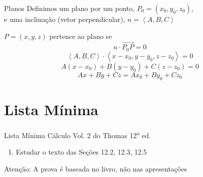 \documentclass[fleqn,utf8,aspectratio=169,12pt,ignorenonframetext]{beamer}
\begin{document}
\begin{frame}{Planos}
  Definimos um plano por um ponto, $P_0=(x_0, y_0, z_0)$, \\
  \pause
  e uma inclinação (vetor perpendicular), $n=\left<A, B, C\right>$

  \pause
  \vspace{\baselineskip}
  $P=(x, y, z)$ pertence ao plano se
  \[
    n\cdot \overrightarrow{P_0P} = 0
  \]
  \pause
  \[
    \left<A, B, C\right>\cdot \left<x-x_0, y-y_0, z-z_0\right> = 0
  \]
  \pause
  \[
    A(x-x_0) + B(y-y_0) + C(z-z_0) = 0
  \]
  \pause
  \[
    Ax + By + Cz = Ax_0 + By_0 + Cz_0
  \]
\end{frame}

\section{Lista Mínima}

\begin{frame}{Lista Mínima}
  Cálculo Vol. 2 do Thomas 12\textsuperscript{a} ed.
  \begin{enumerate}
    \item Estudar o texto das Seções 12.2, 12.3, 12.5
  \end{enumerate}

  \vfill
  Atenção: A prova é baseada no livro, não nas apresentações
\end{frame}

\end{document}

